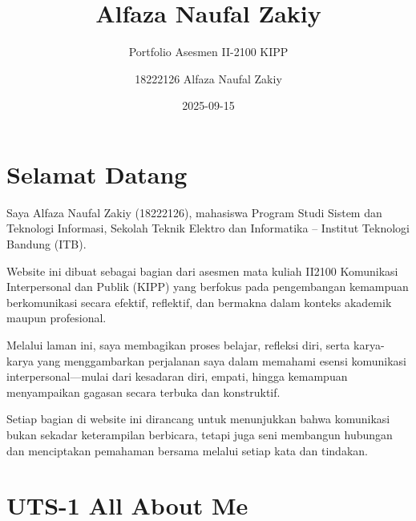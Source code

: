 \documentclass[
  letterpaper,
  DIV=11,
  numbers=noendperiod]{scrreprt}
\title{Alfaza Naufal Zakiy}
\subtitle{Portfolio Asesmen II-2100 KIPP}
\author{18222126 Alfaza Naufal Zakiy}
\date{2025-09-15}
\renewcommand*\contentsname{Table of contents}
\newcommand\contentsname{Table of contents}
\begin{document}
\maketitle

\renewcommand*\contentsname{Table of contents}
{
\hypersetup{linkcolor=}
\setcounter{tocdepth}{2}
\tableofcontents
}


\chapter*{Selamat Datang}\label{selamat-datang}


Saya Alfaza Naufal Zakiy (18222126), mahasiswa Program Studi Sistem dan
Teknologi Informasi, Sekolah Teknik Elektro dan Informatika -- Institut
Teknologi Bandung (ITB).

Website ini dibuat sebagai bagian dari asesmen mata kuliah II2100
Komunikasi Interpersonal dan Publik (KIPP) yang berfokus pada
pengembangan kemampuan berkomunikasi secara efektif, reflektif, dan
bermakna dalam konteks akademik maupun profesional.

Melalui laman ini, saya membagikan proses belajar, refleksi diri, serta
karya-karya yang menggambarkan perjalanan saya dalam memahami esensi
komunikasi interpersonal---mulai dari kesadaran diri, empati, hingga
kemampuan menyampaikan gagasan secara terbuka dan konstruktif.

Setiap bagian di website ini dirancang untuk menunjukkan bahwa
komunikasi bukan sekadar keterampilan berbicara, tetapi juga seni
membangun hubungan dan menciptakan pemahaman bersama melalui setiap kata
dan tindakan.


\chapter{UTS-1 All About Me}\label{uts-1-all-about-me}
\end{document}

